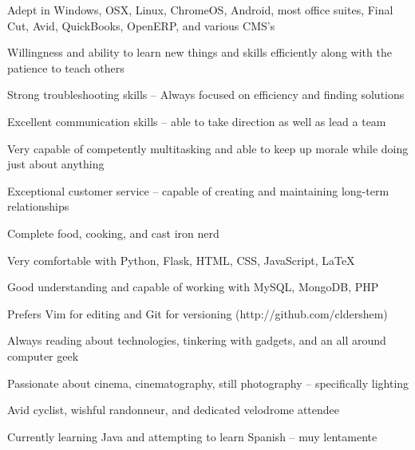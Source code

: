 \documentclass[10pt,letterpaper]{article}			%
\begin{document}
\begin{minipage}[t]{0.5\textwidth}	
	\begin{itemize*}
	\item Adept in Windows, OSX, Linux, ChromeOS, Android, most office suites, \mbox{Final} Cut, Avid, QuickBooks, OpenERP, and various CMS's 
	\item Willingness and ability to learn new things and skills efficiently along with the patience to teach others
	\item Strong troubleshooting skills -- Always focused on efficiency and finding solutions
	\item Excellent communication skills -- able to take direction as well as lead a team
	\item Very capable of competently multitasking and able to keep up morale while doing just about anything
	\item Exceptional customer service -- capable of creating and maintaining long-term relationships
	\item Complete food, cooking, and cast iron nerd
	\end{itemize*}
\end{minipage}
\begin{minipage}[t]{0.5\textwidth}
	\begin{itemize*}
	\item Very comfortable with Python, Flask, HTML, CSS, JavaScript, \LaTeX
	\item Good understanding and capable of working with MySQL, MongoDB, PHP
	\item Prefers Vim for editing and Git for versioning (http://github.com/cldershem)
	\item Always reading about technologies, tinkering with gadgets, and an all around computer geek
	\item Passionate about cinema, cinematography, still photography -- specifically lighting
	\item Avid cyclist, wishful randonneur, and dedicated velodrome attendee
	\item Currently learning Java and attempting to learn Spanish -- muy lentamente
	\end{itemize*}
\end{minipage}
\end{document}
